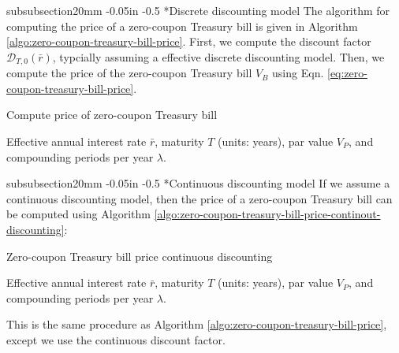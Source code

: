 \documentclass[11pt]{article}
\makeatletter
\theoremstyle{definition}
\renewcommand\subsubsection{\@startsection
	{subsubsection}{2}{0mm}
	{-0.05in}
	{-0.5\baselineskip}
	{\normalfont\normalsize\itshape\bfseries}}
\makeatother
\begin{document}
\subsubsection*{Discrete discounting model}
The algorithm for computing the price of a zero-coupon Treasury bill is given in Algorithm \ref{algo:zero-coupon-treasury-bill-price}.
First, we compute the discount factor $\mathcal{D}_{T,0}(\bar{r})$, typcially assuming a effective discrete discounting model.
Then, we compute the price of the zero-coupon Treasury bill $V_{B}$ using Eqn. \eqref{eq:zero-coupon-treasury-bill-price}.
\begin{algorithm}[h]
    \caption{Compute price of zero-coupon Treasury bill}\label{algo:zero-coupon-treasury-bill-price}
    \begin{algorithmic}[1]
		\Require Effective annual interest rate $\bar{r}$, maturity $T$ (units: years), par value $V_{P}$, and compounding periods per year $\lambda$.

		\Statex
	\end{algorithmic}
\end{algorithm}

\subsubsection*{Continuous discounting model}
If we assume a continuous discounting model, then the price of a zero-coupon Treasury bill can be computed using Algorithm \ref{algo:zero-coupon-treasury-bill-price-continout-discounting}:
\begin{algorithm}[h]
    \caption{Zero-coupon Treasury bill price continuous discounting}\label{algo:zero-coupon-treasury-bill-price-continout-discounting}
    \begin{algorithmic}[1]
		\Require Effective annual interest rate $\bar{r}$, maturity $T$ (units: years), par value $V_{P}$, and compounding periods per year $\lambda$.

		\Statex
	\end{algorithmic}
\end{algorithm}
This is the same procedure as Algorithm \ref{algo:zero-coupon-treasury-bill-price}, except we use the continuous discount factor.
\end{document}
